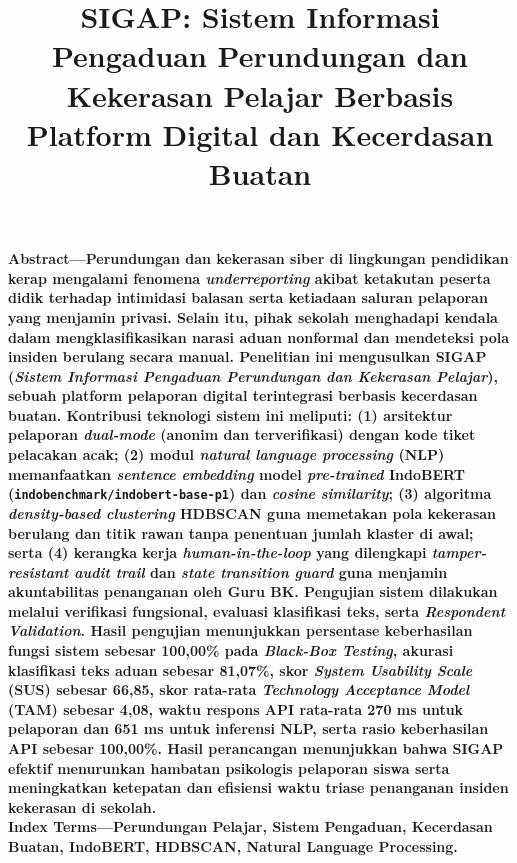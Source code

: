 \documentclass[conference]{IEEEtran}
\begin{document}
\clearpage
\twocolumn

\title{SIGAP: Sistem Informasi Pengaduan Perundungan dan Kekerasan Pelajar Berbasis Platform Digital dan Kecerdasan Buatan}

\author{
}

\maketitle

\noindent\textbf{Abstract---}\textbf{Perundungan dan kekerasan siber di lingkungan pendidikan kerap mengalami fenomena \textit{underreporting} akibat ketakutan peserta didik terhadap intimidasi balasan serta ketiadaan saluran pelaporan yang menjamin privasi. Selain itu, pihak sekolah menghadapi kendala dalam mengklasifikasikan narasi aduan nonformal dan mendeteksi pola insiden berulang secara manual. Penelitian ini mengusulkan SIGAP (\textit{Sistem Informasi Pengaduan Perundungan dan Kekerasan Pelajar}), sebuah platform pelaporan digital terintegrasi berbasis kecerdasan buatan. Kontribusi teknologi sistem ini meliputi: (1) arsitektur pelaporan \textit{dual-mode} (anonim dan terverifikasi) dengan kode tiket pelacakan acak; (2) modul \textit{natural language processing} (NLP) memanfaatkan \textit{sentence embedding} model \textit{pre-trained} IndoBERT (\texttt{indobenchmark/indobert-base-p1}) dan \textit{cosine similarity}; (3) algoritma \textit{density-based clustering} HDBSCAN guna memetakan pola kekerasan berulang dan titik rawan tanpa penentuan jumlah klaster di awal; serta (4) kerangka kerja \textit{human-in-the-loop} yang dilengkapi \textit{tamper-resistant audit trail} dan \textit{state transition guard} guna menjamin akuntabilitas penanganan oleh Guru BK. Pengujian sistem dilakukan melalui verifikasi fungsional, evaluasi klasifikasi teks, serta \textit{Respondent Validation}. Hasil pengujian menunjukkan persentase keberhasilan fungsi sistem sebesar 100,00\% pada \textit{Black-Box Testing}, akurasi klasifikasi teks aduan sebesar 81,07\%, skor \textit{System Usability Scale} (SUS) sebesar 66,85, skor rata-rata \textit{Technology Acceptance Model} (TAM) sebesar 4,08, waktu respons API rata-rata 270 ms untuk pelaporan dan 651 ms untuk inferensi NLP, serta rasio keberhasilan API sebesar 100,00\%. Hasil perancangan menunjukkan bahwa SIGAP efektif menurunkan hambatan psikologis pelaporan siswa serta meningkatkan ketepatan dan efisiensi waktu triase penanganan insiden kekerasan di sekolah.}\\
\textbf{Index Terms---Perundungan Pelajar, Sistem Pengaduan, Kecerdasan Buatan, IndoBERT, HDBSCAN, Natural Language Processing.}
\end{document}
